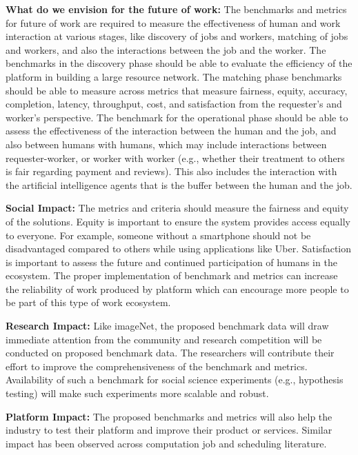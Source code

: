 \textbf{What do we envision for the future of work:}
The benchmarks and metrics for future of work are required to measure the effectiveness of human and work interaction at various stages, like discovery of jobs and workers, matching of jobs and workers, and also the interactions between the job and the worker. The benchmarks in the discovery phase should be able to evaluate the efficiency of the platform in building a large resource network. The matching phase benchmarks should be able to measure across metrics that measure fairness, equity, accuracy, completion, latency, throughput, cost, and satisfaction from the requester’s and worker’s perspective. The benchmark for the operational phase should be able to assess the effectiveness of the interaction between the human and the job, and also between humans with humans, which may include interactions between requester-worker, or worker with worker (e.g., whether their treatment to others is fair regarding payment and reviews). This also includes the interaction with the artificial intelligence agents that is the buffer between the human and the job.


\textbf{Social Impact:} The metrics and criteria should measure the fairness and equity of the solutions. Equity is important to ensure the system provides access equally to everyone. For example, someone without a smartphone should not be disadvantaged compared to others while using applications like Uber.
Satisfaction is important to assess the future and continued participation of humans in the ecosystem.
The proper implementation of benchmark and metrics can increase the reliability of work produced by platform which can encourage more people to be part of this type of  work ecosystem.


\textbf{Research Impact:}
Like imageNet, the proposed benchmark data will draw immediate attention from the community and research competition will be conducted on proposed benchmark data. The researchers will contribute their effort to improve the comprehensiveness of the benchmark and metrics.
Availability of such a benchmark for social science experiments (e.g., hypothesis testing) will make such experiments more scalable and robust.



\textbf{Platform Impact:}
The proposed benchmarks and metrics will also help the industry to test their platform and improve their product or services. Similar impact has been observed across computation job and scheduling literature. 


